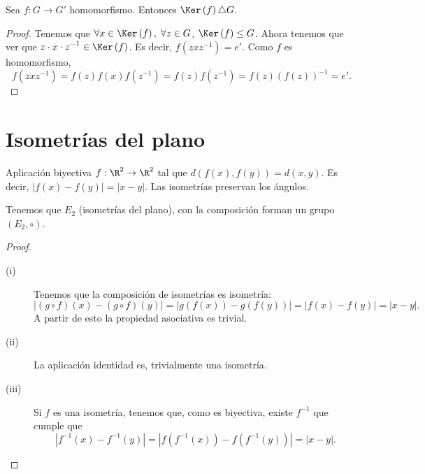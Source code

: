 \begin{fprop}[]
\normalfont Sea $\displaystyle f: G \to G' $ homomorfismo. Entonces $\displaystyle \Ker\left(f\right) \triangle G $.
\end{fprop}
\begin{proof}
Tenemos que $\displaystyle \forall x \in \Ker\left(f\right), \; \forall z \in G $, $\displaystyle \Ker\left(f\right) \leq G $. Ahora tenemos que ver que $\displaystyle z \cdot x \cdot z^{-1} \in \Ker\left(f\right) $. Es decir, $\displaystyle f\left(z xz^{-1}\right) = e' $. Como $\displaystyle f $ es homomorfismo,
\[f\left(zxz^{-1}\right) = f\left(z\right)f\left(x\right)f\left(z^{-1}\right) = f\left(z\right)f\left(z^{-1}\right) = f\left(z\right)\left(f\left(z\right)\right)^{-1} = e' .\]

\end{proof}
\section{Isometrías del plano}

\begin{fdefinition}
\normalfont Aplicación biyectiva $\displaystyle f: \R^{2} \to \R^{2} $ tal que $\displaystyle d\left(f\left(x\right),f\left(y\right)\right) = d\left(x,y\right) $. Es decir, $\displaystyle \left|f\left(x\right)-f\left(y\right)\right| = \left|x-y\right| $. Las isometrías preservan los ángulos.
\end{fdefinition}

\begin{fprop}[]
\normalfont Tenemos que $\displaystyle E_{2} $ (isometrías del plano), con la composición forman un grupo $\displaystyle \left(E_{2}, \circ\right) $.
\end{fprop}
\begin{proof}
\begin{description}
\item[(i)] Tenemos que la composición de isometrías es isometría:
\[ \left|\left(g\circ f\right)\left(x\right)-\left(g\circ f\right)\left(y\right)\right| = \left|g\left(f\left(x\right)\right)-g\left(f\left(y\right)\right)\right|= \left|f\left(x\right)-f\left(y\right)\right| = \left|x-y\right| .\]
A partir de esto la propiedad asociativa es trivial.
\item[(ii)] La aplicación identidad es, trivialmente una isometría.
\item[(iii)] Si $\displaystyle f $ es una isometría, tenemos que, como es biyectiva, existe $\displaystyle f^{-1} $ que cumple que
	\[ \left|f^{-1}\left(x\right)-f^{-1}\left(y\right)\right| = \left|f\left(f^{-1}\left(x\right)\right)-f\left(f^{-1}\left(y\right)\right)\right| = \left|x-y\right| .\]
\end{description}
\end{proof}

